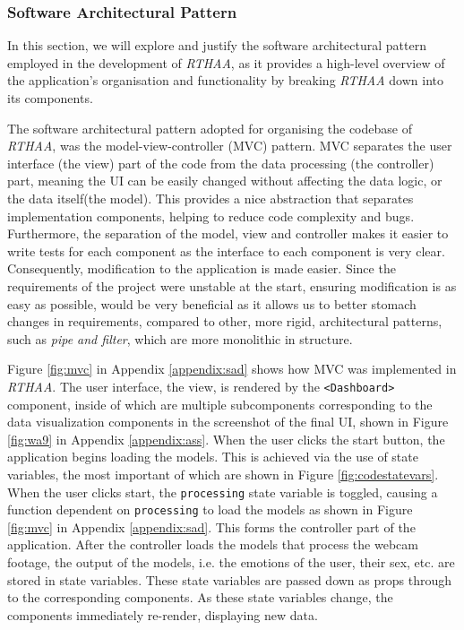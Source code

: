 \documentclass[12pt, a4paper]{article}
\newcommand{\np}
    {
    \vskip 0.4cm
    }
\begin{document}
\subsubsection{Software Architectural Pattern}
\label{sap}

In this section, we will explore and justify the software architectural pattern employed in the development of \textit{RTHAA}, as it provides a high-level overview of the application's organisation and functionality by breaking \textit{RTHAA} down into its components.
\np
The software architectural pattern adopted for organising the codebase of \textit{RTHAA}, was the model-view-controller (MVC) pattern. MVC separates the user interface (the view) part of the code from the data processing (the controller)  part, meaning the UI can be easily changed without affecting the data logic, or the data itself(the model). This  provides a nice abstraction that separates implementation components, helping to reduce code complexity and bugs. Furthermore, the separation of the model, view and controller makes it easier to write tests for each component as the interface to each component is very clear. Consequently, modification to the application is made easier. Since the requirements of the project were unstable at the start, ensuring modification is as easy as possible, would be very beneficial as it allows us to better stomach changes in requirements, compared to other, more rigid, architectural patterns, such as \textit{pipe and filter}, which are more monolithic in structure.
\np
Figure \ref{fig:mvc} in Appendix \ref{appendix:sad} shows how MVC was implemented in \textit{RTHAA}. The user interface, the view, is rendered by the \verb+<Dashboard>+ component, inside of which are multiple subcomponents corresponding to the data visualization components in the screenshot of the final UI, shown in Figure \ref{fig:wa9} in Appendix \ref{appendix:ass}. When the user clicks the start button, the application begins loading the models. This is achieved via the use of state variables, the most important of which are shown in Figure \ref{fig:codestatevars}. When the user clicks start, the \verb+processing+ state variable is toggled, causing a function dependent on \verb+processing+ to load the models as shown in Figure \ref{fig:mvc} in Appendix \ref{appendix:sad}. This forms the controller part of the application. After the controller loads the models that process the webcam footage, the output of the models, i.e. the emotions of the user, their sex, etc. are stored in state variables. These state variables are passed down as props through to the corresponding components. As these state variables change, the components immediately re-render, displaying new data.
\end{document}
